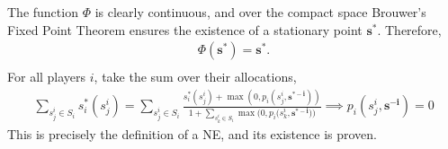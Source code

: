 The function $\Phi$ is clearly continuous, and over the compact space Brouwer's Fixed Point Theorem ensures the existence of a stationary point $\mathbf{s^*}$. Therefore, \\
\begin{align*}
    \Phi(\mathbf{s^*}) = \mathbf{s^*}. \\
\end{align*}
For all players $i$, take the sum over their allocations, \\
\begin{align*}
     \sum_{s_j^i \in S_i} s_i^*(s_j^i) = \sum_{s_j^i \in S_i} \frac{s_i^*(s_j^i) + \max{(0,p_i(s_j^i,\mathbf{s^{*-i}}) )}}{1 + \sum_{s_k^i \in S_i} \max{(0,p_i(s_k^i,\mathbf{{s^{*-i}}) )}} } \implies p_i(s_j^i,\mathbf{s^{-i}}) = 0
\end{align*}
This is precisely the definition of a NE, and its existence is proven. \\
